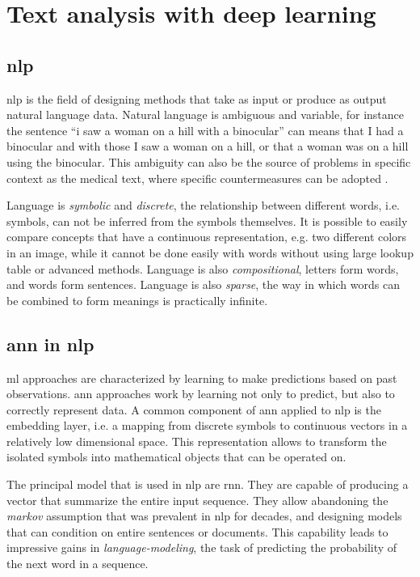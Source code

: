 \chapter{Text analysis with deep learning}

\section{\ac{nlp}}
\ac{nlp} is the field of designing methods that take as input or
produce as output natural language data. Natural language is
ambiguous and variable, for instance the sentence ``i saw a woman on a
hill with a binocular'' can means that I had a binocular and with
those I saw a
woman on a hill, or that a woman was on a hill using the
binocular. This ambiguity can also be the source of problems in
specific context as the medical text, where specific countermeasures
can be adopted \cite{zhao_clinical_2019,codish2005model}.

Language is
\emph{symbolic} and \emph{discrete}, the relationship between different words,
i.e. symbols, can not be inferred from the symbols
themselves. It is possible to easily compare concepts that have a
continuous representation, e.g. two different colors in an image,
while it cannot be done easily with words without using large lookup
table or advanced methods. Language is also \emph{compositional},
letters form words, and words form sentences. Language is also
\emph{sparse}, the way in which words can be combined to form meanings
is practically infinite.

\section{\ac{ann} in \ac{nlp}}
\ac{ml} approaches are characterized by learning to make predictions
based on past observations. \ac{ann} approaches work by learning not
only to predict, but also to correctly represent data. A common
component of \ac{ann} applied to \ac{nlp} is the embedding layer,
i.e. a mapping from discrete symbols to continuous vectors in a
relatively low dimensional space. This representation allows to
transform the isolated symbols into mathematical objects that can be
operated on.

The principal model that is used in \ac{nlp} are \ac{rnn}. They are
capable of producing a vector that summarize the entire input
sequence. They allow abandoning the \emph{markov} assumption that was
prevalent in \ac{nlp} for decades, and designing models that can
condition on entire sentences or documents. This capability leads to
impressive gains in \emph{language-modeling}, the task of predicting
the probability of the next word in a sequence.

